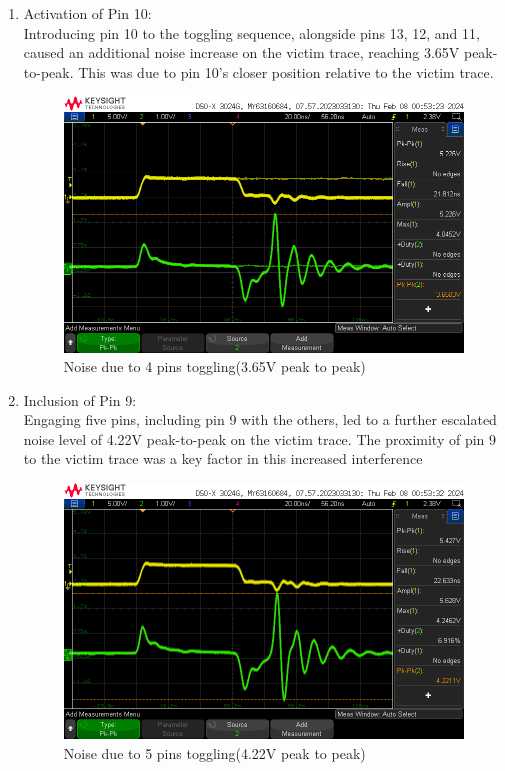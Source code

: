 \documentclass[a4paper,11pt]{article}%
\begin{document}
\begin{enumerate}
	\item Activation of Pin 10:\\ Introducing pin 10 to the toggling sequence, alongside pins 13, 12, and 11, caused an additional noise increase on the victim trace, reaching 3.65V peak-to-peak. This was due to pin 10's closer position relative to the victim trace.
	\begin{figure}[H]
		\centering
		\includegraphics[scale=0.5]{figures/noise_np__cr4.png}
		\caption{Noise due to 4 pins toggling(3.65V peak to peak)}
		\label{noise_np__cr4}
	\end{figure}
	
	\item Inclusion of Pin 9:\\ Engaging five pins, including pin 9 with the others, led to a further escalated noise level of 4.22V peak-to-peak on the victim trace. The proximity of pin 9 to the victim trace was a key factor in this increased interference
	\begin{figure}[H]
		\centering
		\includegraphics[scale=0.5]{figures/noise_np__cr5.png}
		\caption{Noise due to 5 pins toggling(4.22V peak to peak)}
		\label{noise_np__cr5}
	\end{figure}
	

\end{enumerate}
\end{document}
